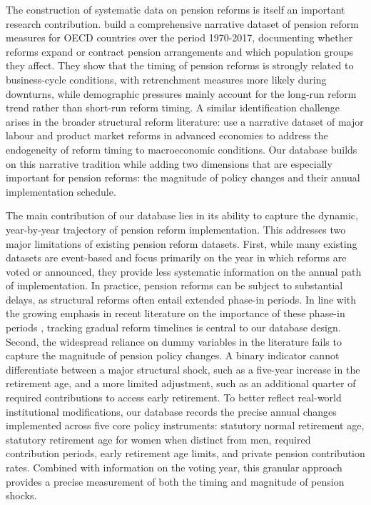 \documentclass[11pt,english,a4paper, twoside, authoryear]{article}
\begin{document}
The construction of systematic data on pension reforms is itself an important research contribution. \citet{Beetsma2020} build a comprehensive narrative dataset of pension reform measures for OECD countries over the period 1970-2017, documenting whether reforms expand or contract pension arrangements and which population groups they affect. They show that the timing of pension reforms is strongly related to business-cycle conditions, with retrenchment measures more likely during downturns, while demographic pressures mainly account for the long-run reform trend rather than short-run reform timing. A similar identification challenge arises in the broader structural reform literature: \citet{DuvalFurceri2018} use a narrative dataset of major labour and product market reforms in advanced economies to address the endogeneity of reform timing to macroeconomic conditions. Our database builds on this narrative tradition while adding two dimensions that are especially important for pension reforms: the magnitude of policy changes and their annual implementation schedule.



The main contribution of our database lies in its ability to capture the dynamic, year-by-year trajectory of pension reform implementation. This addresses two major limitations of existing pension reform datasets. First, while many existing datasets are event-based and focus primarily on the year in which reforms are voted or announced, they provide less systematic information on the annual path of implementation. In practice, pension reforms can be subject to substantial delays, as structural reforms often entail extended phase-in periods. In line with the growing emphasis in recent literature on the importance of these phase-in periods \citep{BiZubairy2023, romp_political_2024}, tracking gradual reform timelines is central to our database design. Second, the widespread reliance on dummy variables in the literature fails to capture the magnitude of pension policy changes. A binary indicator cannot differentiate between a major structural shock, such as a five-year increase in the retirement age, and a more limited adjustment, such as an additional quarter of required contributions to access early retirement. %
To better reflect real-world institutional modifications, our database records the precise annual changes implemented across five core policy instruments: statutory normal retirement age, statutory retirement age for women when distinct from men, required contribution periods, early retirement age limits, and private pension contribution rates. Combined with information on the voting year, this granular approach provides a precise measurement of both the timing and magnitude of pension shocks. 
\end{document}

